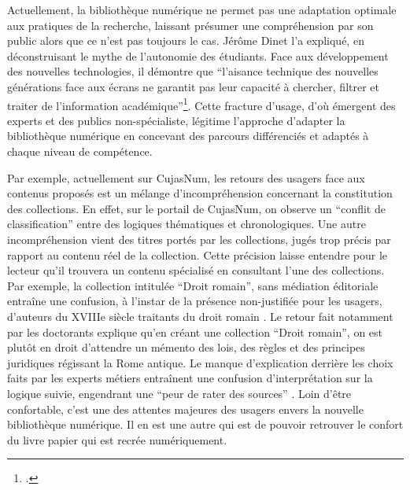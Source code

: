 Actuellement, la bibliothèque numérique ne permet pas une adaptation optimale aux pratiques de la recherche, laissant présumer une compréhension par son public alors que ce n'est pas toujours le cas. Jérôme Dinet l'a expliqué, en déconstruisant le mythe de l'autonomie des étudiants. Face aux développement des nouvelles technologies, il démontre que \enquote{l'aisance technique des nouvelles générations face aux écrans ne garantit pas leur capacité à chercher, filtrer et traiter de l'information académique}\footcite{leblancBibliothequesNumeriquesEnrichies}. Cette fracture d'usage, d'où émergent des experts et des publics non-spécialiste, légitime l'approche d'adapter la bibliothèque numérique en concevant des parcours différenciés et adaptés à chaque niveau de compétence. 
 
Par exemple, actuellement sur CujasNum, les retours des usagers face aux contenus proposés est un mélange d'incompréhension concernant la constitution des collections. En effet, sur le portail de CujasNum, on observe un \enquote{conflit de classification} entre des logiques thématiques et chronologiques. Une autre incompréhension vient des titres portés par les collections, jugés trop précis par rapport au contenu réel de la collection. Cette précision laisse entendre pour le lecteur qu'il trouvera un contenu spécialisé en consultant l'une des collections. Par exemple, la collection intitulée \enquote{Droit romain}, sans médiation éditoriale entraîne une confusion, à l'instar de la présence non-justifiée pour les usagers, d'auteurs du XVIIIe siècle traitants du droit romain . Le retour fait notamment par les doctorants explique qu'en créant une collection \enquote{Droit romain}, on est plutôt en droit d'attendre un mémento des lois, des règles et des principes juridiques régissant la Rome antique. Le manque d'explication derrière les choix faits par les experts métiers entraînent une confusion d'interprétation sur la logique suivie, engendrant une \enquote{peur de rater des sources} . Loin d'être confortable, c'est une des attentes majeures des usagers envers la nouvelle bibliothèque numérique. Il en est une autre qui est de pouvoir retrouver le confort du livre papier qui est recrée numériquement. 